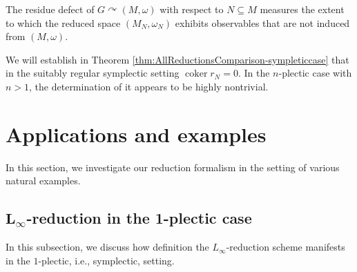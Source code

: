\documentclass[10pt,a4paper]{amsart}
\numberwithin{equation}{section}
\renewcommand{\subset}{\subseteq}
\begin{document}
The residue defect of $G\curvearrowright(M,\omega)$ with respect to $N\subset M$ measures the extent to which the reduced space $(M_N,\omega_N)$ exhibits observables that are not induced from $(M,\omega)$.

We will establish in Theorem \ref{thm:AllReductionsComparison-sympleticcase} that in the suitably regular symplectic setting $\operatorname{coker} r_N=0$. In the $n$-plectic case with $n>1$, the determination of it appears to be highly nontrivial.

\section{Applications and examples}\label{Sec:Examples}

In this section, we investigate our reduction formalism in the setting of various natural examples.

\subsection[L\_infty-reduction in the 1-plectic case]{$\boldsymbol{L_\infty}$-reduction in the 1-plectic case}\label{Ssec:LinftyRed-SympCase}

In this subsection, we discuss how definition the $L_\infty$-reduction scheme manifests in the $1$-plectic, i.e., symplectic, setting.

\end{document}
